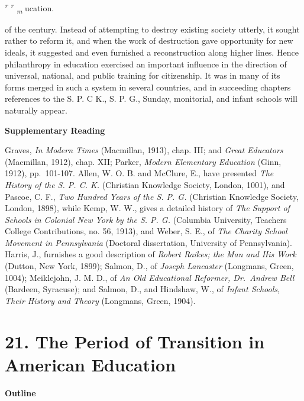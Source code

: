 \documentclass[]{book}
\begin{document}
\emph{\textsuperscript{r} \textsuperscript{r} \textsubscript{m}} ucation.

of the century. Instead of attempting to destroy existing society utterly, it sought rather to reform it, and when the work of destruction gave opportunity for new\protect\hypertarget{ch20.xmlux5cux23para.311.1.0.box.283.244.1050.421.q.60}{}{ ideals, it suggested and even furnished a reconstruction along higher lines. Hence philanthropy in education exercised an important influence in the direction of universal, national, and public training for citizenship. It was in many of its forms merged in such a system in several countries, and in succeeding chapters references to the S. P. C K., S. P. G., Sunday, monitorial, and infant schools will naturally appear.}

\textbf{Supplementary Reading}

Graves, \emph{In Modern Times} (Macmillan, 1913), chap. III; and \emph{Great Educators} (Macmillan, 1912), chap. XII; Parker, \emph{Modern Elementary Education} (Ginn, 1912), pp.~101-107. Allen, W. O. B. and McClure, E., have presented \emph{The History of the S. P. C. K.} (Christian Knowledge Society, London, 1001), and Pascoe, C. F., \emph{Two Hundred Years of the S. P. G.} (Christian Knowledge Society, London, 1898), while Kemp, W. W., gives a detailed history of \emph{The Support of Schools in Colonial New York by the S. P. G.} (Columbia University, Teachers College Contributions, no. 56, 1913), and Weber, S. E., of \emph{The Charity School Movement in Pennsylvania} (Doctoral dissertation, University of Pennsylvania). Harris, J., furnishes a good description of \emph{Robert Raikes; the Man and His Work} (Dutton, New York, 1899); Salmon, D., of \emph{Joseph Lancaster} (Longmans, Green, 1004); Meiklejohn, J. M. D., of \emph{An Old Educational Reformer, Dr.~Andrew Bell} (Bardeen, Syracuse); and Salmon, D., and Hindshaw, W., of \emph{Infant Schools, Their History and Theory} (Longmans, Green, 1904).

\hypertarget{the-period-of-transition-in-american-education}{%
\chapter{21. The Period of Transition in American Education}\label{the-period-of-transition-in-american-education}}

\textbf{Outline}
\end{document}
